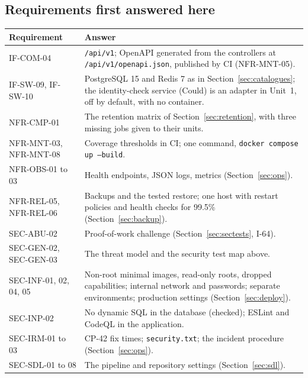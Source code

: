 \documentclass[11pt,a4paper]{article}
\newenvironment{dtable}[1]{\small\begin{longtable}{#1}}{\end{longtable}}
\begin{document}
\subsection{Requirements first answered here}
\begin{dtable}{@{}>{\ttfamily\raggedright\arraybackslash}p{3.6cm}>{\raggedright\arraybackslash}p{11.6cm}@{}}
\toprule
\textnormal{\textbf{Requirement}} & \textbf{Answer} \\ \midrule \endhead
IF-COM-04 & \texttt{/api/v1}; OpenAPI generated from the controllers at \texttt{/api/v1/openapi.\allowbreak json}, published by CI (NFR-MNT-05). \\
IF-SW-09, IF-SW-10 & PostgreSQL 15 and Redis 7 as in Section~\ref{sec:catalogues}; the identity-check service (Could) is an adapter in Unit~1, off by default, with no container. \\
NFR-CMP-01 & The retention matrix of Section~\ref{sec:retention}, with three missing jobs given to their units. \\
NFR-MNT-03, NFR-MNT-08 & Coverage thresholds in CI; one command, \texttt{docker compose up --build}. \\
NFR-OBS-01 to 03 & Health endpoints, JSON logs, metrics (Section~\ref{sec:ops}). \\
NFR-REL-05, NFR-REL-06 & Backups and the tested restore; one host with restart policies and health checks for 99.5\% (Section~\ref{sec:backup}). \\
SEC-ABU-02 & Proof-of-work challenge (Section~\ref{sec:sectests}, I-64). \\
SEC-GEN-02, SEC-GEN-03 & The threat model and the security test map above. \\
SEC-INF-01, 02, 04, 05 & Non-root minimal images, read-only roots, dropped capabilities; internal network and passwords; separate environments; production settings (Section~\ref{sec:deploy}). \\
SEC-INP-02 & No dynamic SQL in the database (checked); ESLint and CodeQL in the application. \\
SEC-IRM-01 to 03 & CP-42 fix times; \texttt{security.txt}; the incident procedure (Section~\ref{sec:ops}). \\
SEC-SDL-01 to 08 & The pipeline and repository settings (Section~\ref{sec:sdl}). \\
\bottomrule
\end{dtable}
\end{document}
